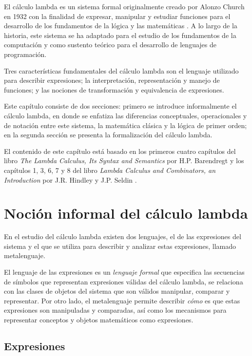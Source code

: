 El cálculo lambda es un sistema formal originalmente creado por Alonzo Church en 1932 \cite{Church:FoundationsLogic} con la finalidad de expresar, manipular y estudiar funciones para el desarrollo de los fundamentos de la lógica y las matemáticas \cite[p.~248]{Church:FoundationsLogic}. A lo largo de la historia, este sistema se ha adaptado para el estudio de los fundamentos de la computación y como sustento teórico para el desarrollo de lenguajes de programación.

Tres características fundamentales del cálculo lambda son el lenguaje utilizado para describir expresiones; la interpretación, representación y manejo de funciones; y las nociones de transformación y equivalencia de expresiones.

Este capítulo consiste de dos secciones: primero se introduce informalmente el cálculo lambda, en donde se enfatiza las diferencias conceptuales, operacionales y de notación entre este sistema, la matemática clásica y la lógica de primer orden; en la segunda sección se presenta la formalización del cálculo lambda.

El contenido de este capítulo está basado en los primeros cuatro capítulos del libro \emph{The Lambda Calculus, Its Syntax and Semantics} por H.P. Barendregt \cite{Barendregt:Bible} y los capítulos 1, 3, 6, 7 y 8 del libro \emph{Lambda Calculus and Combinators, an Introduction} por J.R. Hindley y J.P. Seldin \cite{HindleySeldin:LambdaCalculusAndCombinators}.

\section{Noción informal del cálculo lambda}
\label{sec:informal}

En el estudio del cálculo lambda existen dos lenguajes, el de las expresiones del sistema y el que se utiliza para describir y analizar estas expresiones, llamado metalenguaje.

El lenguaje de las expresiones es un \emph{lenguaje formal} que especifica las secuencias de símbolos que representan expresiones válidas del cálculo lambda, se relaciona con las clases de objetos del sistema que son válidos manipular, comparar y representar. Por otro lado, el metalenguaje permite describir \emph{cómo} es que estas expresiones son manipuladas y comparadas, así como los mecanismos para representar conceptos y objetos matemáticos como expresiones.

\subsection{Expresiones}
\label{sec:expresiones}


